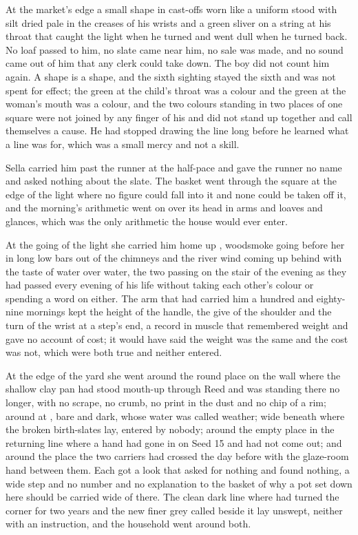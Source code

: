 At the market's edge a small shape in cast-offs worn like a uniform stood with silt dried pale in the creases of his wrists and a green sliver on a string at his throat that caught the light when he turned and went dull when he turned back. No loaf passed to him, no slate came near him, no sale was made, and no sound came out of him that any clerk could take down. The boy did not count him again. A shape is a shape, and the sixth sighting stayed the sixth and was not spent for effect; the green at the child's throat was a colour and the green at the woman's mouth was a colour, and the two colours standing in two places of one square were not joined by any finger of his and did not stand up together and call themselves a cause. He had stopped drawing the line long before he learned what a line was for, which was a small mercy and not a skill.

Sella carried him past the runner at the half-pace and gave the runner no name and asked nothing about the slate. The basket went through the square at the edge of the light where no figure could fall into it and none could be taken off it, and the morning's arithmetic went on over its head in arms and loaves and glances, which was the only arithmetic the house would ever enter.

\scenebreak

At the going of the light she carried him home up , woodsmoke going before her in long low bars out of the chimneys and the river wind coming up behind with the taste of water over water, the two passing on the stair of the evening as they had passed every evening of his life without taking each other's colour or spending a word on either. The arm that had carried him a hundred and eighty-nine mornings kept the height of the handle, the give of the shoulder and the turn of the wrist at a step's end, a record in muscle that remembered weight and gave no account of cost; it would have said the weight was the same and the cost was not, which were both true and neither entered.

At the edge of the yard she went around the round place on the wall where the shallow clay pan had stood mouth-up through Reed and was standing there no longer, with no scrape, no crumb, no print in the dust and no chip of a rim; around  at , bare and dark, whose water was called weather; wide beneath  where the broken birth-slates lay, entered by nobody; around the empty place in the returning line where a hand had gone in on Seed 15 and had not come out; and around the place the two carriers had crossed the day before with the glaze-room hand between them. Each got a look that asked for nothing and found nothing, a wide step and no number and no explanation to the basket of why a pot set down here should be carried wide of there. The clean dark line where  had turned the corner for two years and the new finer grey called  beside it lay unswept, neither with an instruction, and the household went around both.

